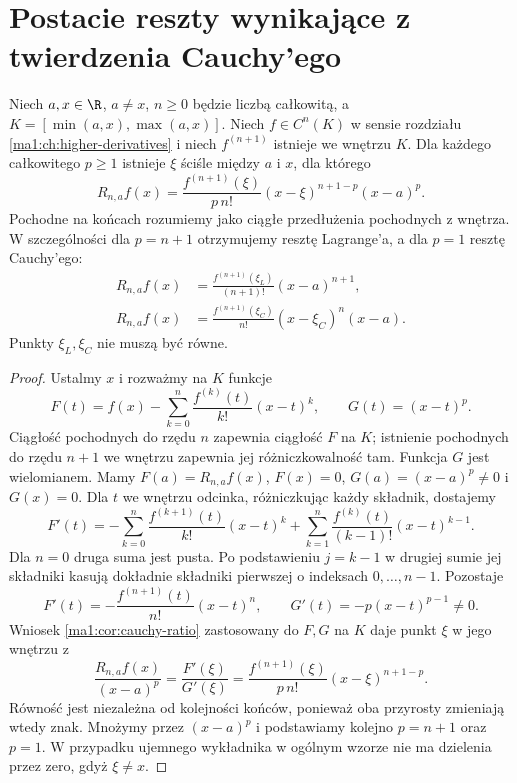 \section{Postacie reszty wynikające z twierdzenia Cauchy'ego}
\begin{twierdzenie}
\label{ma1:thm:taylor-remainders}
Niech $a,x\in\R$, $a\ne x$, $n\ge0$ będzie liczbą całkowitą, a $K=[\min(a,x),\max(a,x)]$. Niech $f\in C^n(K)$ w sensie rozdziału \ref{ma1:ch:higher-derivatives} i niech $f^{(n+1)}$ istnieje we wnętrzu $K$. Dla każdego całkowitego $p\ge1$ istnieje $\xi$ ściśle między $a$ i $x$, dla którego
\[
 R_{n,a}f(x)=
 \frac{f^{(n+1)}(\xi)}{p\,n!}
 (x-\xi)^{n+1-p}(x-a)^p.
\]
Pochodne na końcach rozumiemy jako ciągłe przedłużenia pochodnych z wnętrza. W szczególności dla $p=n+1$ otrzymujemy resztę Lagrange'a, a dla $p=1$ resztę Cauchy'ego:
\[
 \begin{aligned}
 R_{n,a}f(x)&=\frac{f^{(n+1)}(\xi_L)}{(n+1)!}(x-a)^{n+1},\\
 R_{n,a}f(x)&=\frac{f^{(n+1)}(\xi_C)}{n!}(x-\xi_C)^n(x-a).
 \end{aligned}
\]
Punkty $\xi_L,\xi_C$ nie muszą być równe.
\end{twierdzenie}
\begin{proof}
Ustalmy $x$ i rozważmy na $K$ funkcje
\[
 F(t)=f(x)-\sum_{k=0}^n\frac{f^{(k)}(t)}{k!}(x-t)^k,
 \qquad G(t)=(x-t)^p.
\]
Ciągłość pochodnych do rzędu $n$ zapewnia ciągłość $F$ na $K$; istnienie pochodnych do rzędu $n+1$ we wnętrzu zapewnia jej różniczkowalność tam. Funkcja $G$ jest wielomianem. Mamy $F(a)=R_{n,a}f(x)$, $F(x)=0$, $G(a)=(x-a)^p\ne0$ i $G(x)=0$. Dla $t$ we wnętrzu odcinka, różniczkując każdy składnik, dostajemy
\[
 F'(t)=-\sum_{k=0}^n\frac{f^{(k+1)}(t)}{k!}(x-t)^k
       +\sum_{k=1}^n\frac{f^{(k)}(t)}{(k-1)!}(x-t)^{k-1}.
\]
Dla $n=0$ druga suma jest pusta. Po podstawieniu $j=k-1$ w drugiej sumie jej składniki kasują dokładnie składniki pierwszej o indeksach $0,\ldots,n-1$. Pozostaje
\[
 F'(t)=-\frac{f^{(n+1)}(t)}{n!}(x-t)^n,
 \qquad G'(t)=-p(x-t)^{p-1}\ne0.
\]
Wniosek \ref{ma1:cor:cauchy-ratio} zastosowany do $F,G$ na $K$ daje punkt $\xi$ w jego wnętrzu z
\[
 \frac{R_{n,a}f(x)}{(x-a)^p}
 =\frac{F'(\xi)}{G'(\xi)}
 =\frac{f^{(n+1)}(\xi)}{p\,n!}(x-\xi)^{n+1-p}.
\]
Równość jest niezależna od kolejności końców, ponieważ oba przyrosty zmieniają wtedy znak. Mnożymy przez $(x-a)^p$ i podstawiamy kolejno $p=n+1$ oraz $p=1$. W przypadku ujemnego wykładnika w ogólnym wzorze nie ma dzielenia przez zero, gdyż $\xi\ne x$.
\end{proof}

